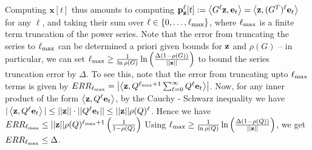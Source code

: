 Computing $\mathbf{x}[t]$ thus amounts to computing ${\mathbf{p}}_\mathbf{z}^{\ell}[t] := \left< G^{\ell}\mathbf{z}, \mathbf{e}_t \right> = \left< \mathbf{z}, (G^T)^{\ell}\mathbf{e}_t \right>$ for any $\ell$, and taking their sum over $\ell \in \{0,\ldots,\ell_{\max}\}$, where $\ell_{\max}$ is a finite term truncation of the power series.
Note that the error from truncating the series to $\ell_{\max}$ can be determined a priori given bounds for $\mathbf{z}$ and $\rho(G)$ -- in particular, we can set $\ell_{\max} \geq \frac{1}{\ln \rho(G)} \ln \left(\frac{\Delta(1 - \rho(G))}{||\mathbf{z}||} \right)$  to bound the series truncation error by $\Delta$. 
To see this, note that the error from truncating upto $\ell_{\max}$ terms is given by $ERR_{\ell_{\max}} = \left| \left< \mathbf{z},  Q^{\ell_{\max} + 1} \sum_{\ell= 0}^\infty Q^\ell\mathbf{e}_t \right> \right|$. Now, for any inner product of the form $\left< \mathbf{z}, Q^\ell \mathbf{e}_t \right>$, by the Cauchy - Schwarz inequality we have $|\left< \mathbf{z}, Q^\ell \mathbf{e}_t \right>| \leq ||\mathbf{z}|| \cdot ||{Q}^\ell \mathbf{e}_t|| \leq ||\mathbf{z}|| \rho(Q)^{\ell}$.
Hence we have
$ERR_{\lm} \leq %
 ||\bz|| \rho(Q)^{\lm+1}\left(\frac{1}{1 - \rho(Q)} \right)$
Using $\ell_{\max} \geq \frac{1}{\ln \rho(Q)}  \ln \left(\frac{\Delta(1 - \rho(Q)) }{||\mathbf{z}||}\right)$, we get $ERR_{\ell_{\max}} \leq \Delta$.

